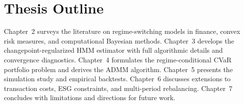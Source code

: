 \section{Thesis Outline}

Chapter~2 surveys the literature on regime-switching models in finance, convex risk measures, and computational Bayesian methods. Chapter~3 develops the changepoint-regularized HMM estimator with full algorithmic details and convergence diagnostics. Chapter~4 formulates the regime-conditional CVaR portfolio problem and derives the ADMM algorithm. Chapter~5 presents the simulation study and empirical backtests. Chapter~6 discusses extensions to transaction costs, ESG constraints, and multi-period rebalancing. Chapter~7 concludes with limitations and directions for future work.

